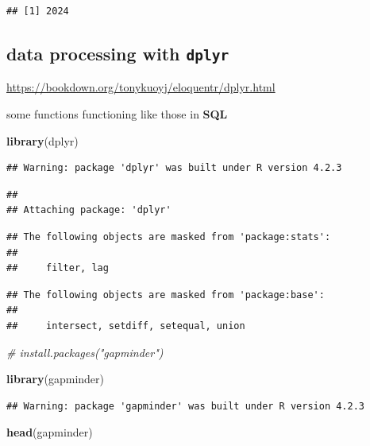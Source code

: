 \documentclass[
]{book}
\newenvironment{Shaded}{\begin{snugshade}}{\end{snugshade}}
\newcommand{\CommentTok}[1]{\textcolor[rgb]{0.56,0.35,0.01}{\textit{#1}}}
\newcommand{\FunctionTok}[1]{\textcolor[rgb]{0.13,0.29,0.53}{\textbf{#1}}}
\newcommand{\NormalTok}[1]{#1}
\theoremstyle{definition}
\theoremstyle{definition}
\theoremstyle{definition}
\theoremstyle{definition}
\theoremstyle{remark}
\begin{document}
\begin{verbatim}
## [1] 2024
\end{verbatim}

\hypertarget{data-processing-with-dplyr}{%
\subsection{\texorpdfstring{data processing with \texttt{dplyr}}{data processing with dplyr}}\label{data-processing-with-dplyr}}

\url{https://bookdown.org/tonykuoyj/eloquentr/dplyr.html}

some functions functioning like those in \textbf{SQL}

\begin{Shaded}
\begin{Highlighting}[]
\FunctionTok{library}\NormalTok{(dplyr)}
\end{Highlighting}
\end{Shaded}

\begin{verbatim}
## Warning: package 'dplyr' was built under R version 4.2.3
\end{verbatim}

\begin{verbatim}
## 
## Attaching package: 'dplyr'
\end{verbatim}

\begin{verbatim}
## The following objects are masked from 'package:stats':
## 
##     filter, lag
\end{verbatim}

\begin{verbatim}
## The following objects are masked from 'package:base':
## 
##     intersect, setdiff, setequal, union
\end{verbatim}

\begin{Shaded}
\begin{Highlighting}[]
\CommentTok{\# install.packages("gapminder")}

\FunctionTok{library}\NormalTok{(gapminder)}
\end{Highlighting}
\end{Shaded}

\begin{verbatim}
## Warning: package 'gapminder' was built under R version 4.2.3
\end{verbatim}

\begin{Shaded}
\begin{Highlighting}[]
\FunctionTok{head}\NormalTok{(gapminder)}
\end{Highlighting}
\end{Shaded}
\end{document}
